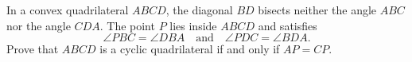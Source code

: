 In a convex quadrilateral $ABCD$,  the diagonal $BD$ bisects neither the angle $ABC$ nor the angle $CDA$. The point $P$ lies inside $ABCD$ and satisfies \[\angle PBC=\angle DBA\quad\text{and}\quad \angle PDC=\angle BDA.\] Prove that $ABCD$ is a cyclic quadrilateral if and only if $AP=CP$.
